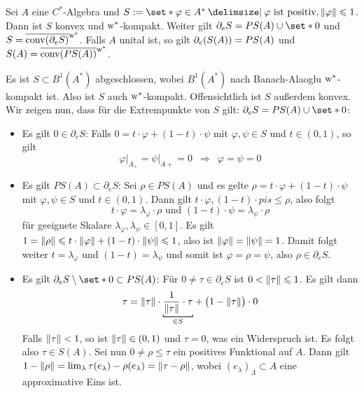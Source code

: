 \begin{satz}[label=satz:711]
	Sei $A$ eine $C^*$-Algebra und $S:= \set*{\varphi \in A^* \given \varphi \text{ ist positiv}, \norm*{\varphi}\le 1}$.
	Dann ist $S$ konvex und $\w^*$-kompakt. 
	Weiter gilt $\partial_e S = PS(A) \cup \set*{0}$ und $S= \overline{\conv(\partial_e S)}^{\raisemath{-.4ex}{\w^*}}$.
	Falls $A$ unital ist, so gilt $\partial_e \enbrace*{S(A)} =PS(A)$ und $S(A) = \overline{\conv \enbrace*{PS(A)}}^{\raisemath{-.4ex}{\w^*}}$. 
\end{satz}
\begin{beweis}
	Es ist $S \subset B^1(A^*)$ abgeschlossen, wobei $B^1(A^*)$ nach Banach-Alaoglu $\w^*$-kompakt ist.
	Also ist $S$ auch $\w^*$-kompakt. 
	Offensichtlich ist $S$ außerdem konvex.
	Wir zeigen nun, dass für die Extrempunkte von $S$ gilt: $\partial_e S = PS(A) \cup \set*{0}$:
	\begin{itemize}
		\item Es gilt $0 \in \partial_e S$:
		Falls $0=t \cdot \varphi + (1-t) \cdot \psi$ mit $\varphi,\psi \in S$ und $t \in (0,1)$, so gilt
		\[
			\varphi\big|_{A_+} = \psi\big|_{A+}=0 \enspace\Longrightarrow \enspace \varphi=\psi=0
		\]
		\item Es gilt $PS(A) \subset \partial_e S$: Sei $\rho \in PS(A)$ und es gelte $\rho = t \cdot \varphi + (1-t) \cdot \psi$ mit $\varphi,\psi \in S$ und $t \in (0,1)$.
		Dann gilt $t \cdot \varphi, (1-t) \cdot pis	 \le \rho$, also folgt 
		\[
			t \cdot \varphi = \lambda_\varphi \cdot \rho \text{ und } (1-t) \cdot \psi = \lambda_\psi \cdot \rho 
		\]
		für geeignete Skalare $\lambda_\varphi, \lambda_\psi \in [0,1]$.
		Es gilt $1= \norm*{\rho} \le t \cdot \norm*{\varphi} + (1-t) \cdot \norm*{\psi} \le 1$, also ist $\norm*{\varphi}=\norm*{\psi}=1$.
		Damit folgt weiter $t=\lambda_\varphi$ und $(1-t)=\lambda_\psi$ und somit ist $\varphi=\rho=\psi$, also $\rho \in \partial_e S$.
		\item Es gilt $\partial_e S \setminus \set*{0} \subset PS(A)$: Für $0\neq\tau \in \partial_e S$ ist $0<\norm*{\tau}\le1$.
		Es gilt dann
		\[
			\tau= \norm*{\tau} \cdot \Underbracket{\frac{1}{\norm*{\tau}} \cdot \tau}{\in S} + \enbrace[\big]{1- \norm*{\tau}} \cdot 0 
		\]
		Falls $\norm*{\tau}<1$, so ist $\norm*{\tau} \in (0,1)$ und $\tau=0$, was ein Widerspruch ist. Es folgt also $\tau \in S(A)$.
		Sei nun $0\neq \rho \le \tau$ ein positives Funktional auf $A$.
		Dann gilt $1- \norm*{\rho} = \lim_\lambda \tau(e_\lambda) - \rho(e_\lambda)= \norm*{\tau- \rho}$, wobei $(e_\lambda)_\Lambda \subset A$ eine approximative Eins ist.

\end{itemize}
\end{beweis}
